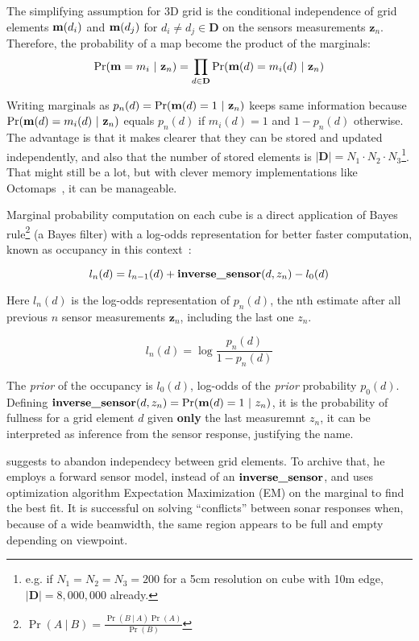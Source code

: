 The simplifying assumption for 3D grid is the conditional
independence of grid
elements $\mathrm{\mathbf{m}}(d_i)$ and $\mathrm{\mathbf{m}}(d_j)$ for $d_i\neq d_j \in \mathbf{D}$
on the sensors measurements $\mathbf{z}_n$.
Therefore, the probability of a map become the product of the marginals:
\begin{equation*}
\Pr(\mathrm{\mathbf{m}}=m_i~|~\mathbf{z}_n)=\prod_{d\in\mathbf{D}}\Pr(\mathrm{\mathbf{m}}(d)=m_i(d)~|~\mathbf{z}_n)
\end{equation*}

Writing marginals as $p_n(d) = \Pr(\mathrm{\mathbf{m}}(d)=1~|~\mathbf{z}_n)$ keeps same
information because $\Pr(\mathrm{\mathbf{m}}(d)=m_i(d)~|~\mathbf{z}_n)$ equals $p_n(d)$ if
$m_i(d)=1$ and $1-p_n(d)$ otherwise. The advantage is that it makes clearer that
they can be stored and updated independently, and also that the number of stored
elements is $|\mathbf{D}|=N_1\cdot N_2\cdot N_3$\footnote{e.g. if
$N_1=N_2=N_3=200$ for a 5cm resolution on cube with 10m edge,
$|\mathbf{D}|=8,000,000$ already.}.
That might still be a lot, but with clever memory implementations like
Octomaps~\cite{hornung2013octomap}, it can be manageable.

Marginal probability computation on each cube is a direct application of Bayes
rule\footnote{$\Pr(A~|~B)=\frac{\Pr(B~|~A)\Pr(A)}{\Pr(B)}$} (a Bayes filter)
with a log-odds representation for better faster
computation, known as occupancy in this context~\cite{thrunprob}:

\begin{equation}
\label{eq:gridoccupancy}
l_n(d) = l_{n-1}(d)+ \text{\textbf{inverse\_sensor}}(d,z_n) - l_0(d)
\end{equation}

Here $l_n(d)$ is the log-odds representation of $p_n(d)$, the nth estimate after
all previous $n$ sensor measurements $\mathbf{z}_n$, including the last one
$z_n$.

\begin{equation*}
l_n(d) = \log\frac{p_n(d)}{1-p_n(d)} 
\end{equation*}

The \textit{prior} of the occupancy is $l_0(d)$, log-odds of the \textit{prior}
probability $p_0(d)$. Defining
$\text{\textbf{inverse\_sensor}}(d,z_n)=\Pr(\mathrm{\mathbf{m}}(d)=1~|~z_n)$, it is the
probability of fullness for a grid element $d$ given \textbf{only} the last
measuremnt $z_n$, it can be interpreted as inference from the sensor response,
justifying the name.

\citet{thrunprob} suggests to abandon independecy between grid elements. To
archive that, he employs a forward sensor model, instead of an
$\text{\textbf{inverse\_sensor}}$, and uses optimization algorithm Expectation
Maximization (EM) on the marginal to find the best fit. It is successful on
solving ``conflicts'' between sonar responses when, because of a wide beamwidth,
the same region appears to be full and empty depending on viewpoint.

